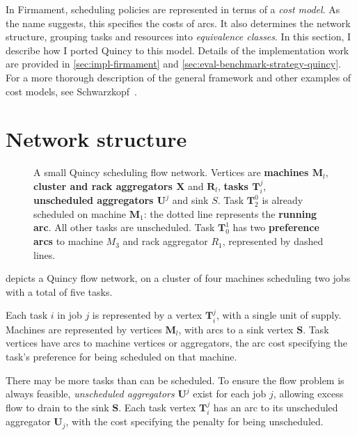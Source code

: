 In Firmament, scheduling policies are represented in terms of a \emph{cost model}. As the name suggests, this specifies the costs of arcs. It also determines the network structure, grouping tasks and resources into \emph{equivalence classes}. In this section, I describe how I ported Quincy to this model. Details of the implementation work are provided in \cref{sec:impl-firmament} and \cref{sec:eval-benchmark-strategy-quincy}. For a more thorough description of the general framework and other examples of cost models, see Schwarzkopf~\cite[ch.~5]{Schwarzkopf:2015}.

\section{Network structure} \label{appendix:flow-scheduling:structure}

\begin{figure}
    \centering
    
    \caption[Quincy scheduling flow network]{A small Quincy scheduling flow network. Vertices are \textbf{\color{blue} machines $\mathbf{M}_l$}, \textbf{\color{brown} cluster and rack aggregators $\mathbf{X}$} and \textbf{\color{brown}$\mathbf{R}_l$}, \textbf{\color{green} tasks $\mathbf{T}_i^j$}, \textbf{\color{red} unscheduled aggregators $\mathbf{U}^j$} and sink $S$. Task $\mathbf{T}_2^0$ is already scheduled on machine $\mathbf{M}_1$: the dotted line represents the \textbf{running arc}. All other tasks are unscheduled. Task $\mathbf{T}_0^1$ has two \textbf{preference arcs} to machine $M_3$ and rack aggregator $R_1$, represented by dashed lines.}
    \label{fig:flow-network-no-costs-appendix}
\end{figure}

 depicts a Quincy flow network, on a cluster of four machines scheduling two jobs with a total of five tasks.

Each task $i$ in job $j$ is represented by a vertex $\mathbf{T}_i^j$, with a single unit of supply. Machines are represented by vertices $\mathbf{M}_l$, with arcs to a sink vertex $\mathbf{S}$. Task vertices have arcs to machine vertices or aggregators, the arc cost specifying the task's preference for being scheduled on that machine.

There may be more tasks than can be scheduled. To ensure the flow problem is always feasible, \emph{unscheduled aggregators} $\mathbf{U}^j$ exist for each job $j$, allowing excess flow to drain to the sink $\mathbf{S}$. Each task vertex $\mathbf{T}_i^j$ has an arc to its unscheduled aggregator $\mathbf{U}_j$, with the cost specifying the penalty for being unscheduled.

